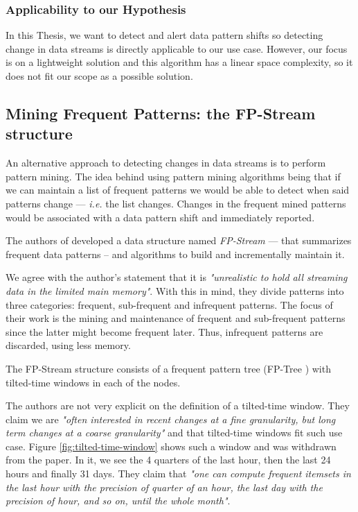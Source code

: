 \subsubsection*{Applicability to our Hypothesis}
In this Thesis, we want to detect and alert data pattern shifts so detecting change in data streams is directly applicable to our use case. However, our focus is on a lightweight solution and this algorithm has a linear space complexity, so it does not fit our scope as a possible solution.


\subsection{Mining Frequent Patterns: the FP-Stream structure}
An alternative approach to detecting changes in data streams is to perform pattern mining. The idea behind using pattern mining algorithms being that if we can maintain a list of frequent patterns we would be able to detect when said patterns change --- \textit{i.e.} the list changes. Changes in the frequent mined patterns would be associated with a data pattern shift and immediately reported. 

The authors of \cite{Giannella-Mining-Frequent-Patterns} developed a data structure named \textit{FP-Stream} --- that summarizes frequent data patterns -- and algorithms to build and incrementally maintain it.

We agree with the author's statement that it is \textit{"unrealistic to hold all streaming data in the limited main memory"}. With this in mind, they divide patterns into three categories: frequent, sub-frequent and infrequent patterns. The focus of their work is the mining and maintenance of frequent and sub-frequent patterns since the latter might become frequent later. Thus, infrequent patterns are discarded, using less memory.

The FP-Stream structure consists of a frequent pattern tree (FP-Tree \cite{Han-FP-tree}) with tilted-time windows in each of the nodes.

The authors are not very explicit on the definition of a tilted-time window. They claim we are \textit{"often interested in recent changes at a fine granularity, but long term changes at a coarse granularity"} and that tilted-time windows fit such use case. Figure \ref{fig:tilted-time-window} shows such a window and was withdrawn from the paper. In it, we see the 4 quarters of the last hour, then the last 24 hours and finally 31 days. They claim that \textit{"one can compute frequent itemsets in the last hour with the precision of quarter of an hour, the last day with the precision of hour, and so on, until the whole month"}.


